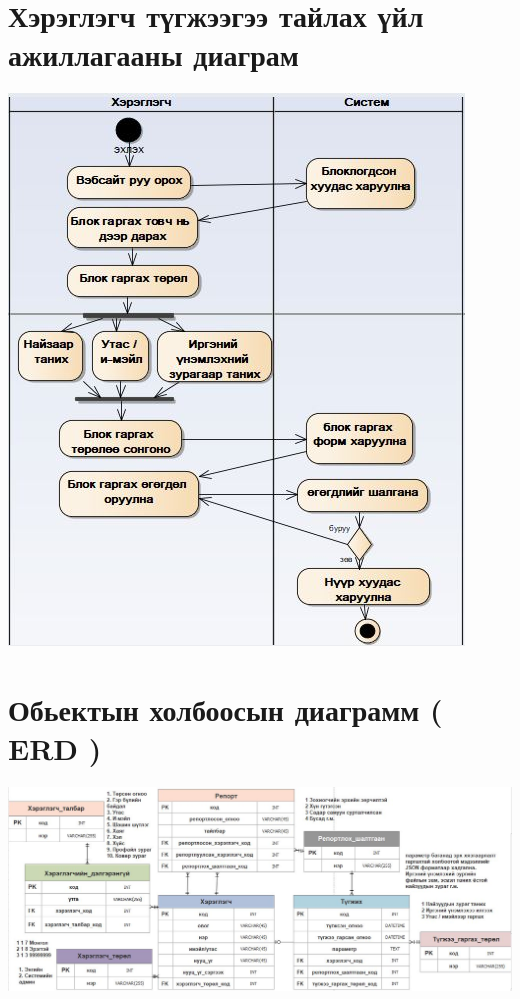 \documentclass[
oneside, %
english, %
onehalfspacing, %
nolistspacing, %
headsepline, %
]{article} %
\begin{document}
     \section{Хэрэглэгч түгжээгээ тайлах үйл ажиллагааны диаграм}
     \includegraphics[width=\textwidth]{unblockActivity}
     \section{Обьектын холбоосын диаграмм ( ERD )}
     \includegraphics[width=\textwidth]{ERDagram}
\end{document}
